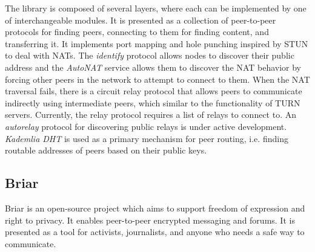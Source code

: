 The library is composed of several layers, where each can be implemented by one of interchangeable modules. It is presented as a collection of peer-to-peer protocols for finding peers, connecting to them for finding content, and transferring it. It implements port mapping and hole punching inspired by STUN to deal with NATs. The \textit{identify} protocol allows nodes to discover their public address and the \textit{AutoNAT} service allows them to discover the NAT behavior by forcing other peers in the network to attempt to connect to them. When the NAT traversal fails, there is a circuit relay protocol that allows peers to communicate indirectly using intermediate peers, which similar to the functionality of TURN servers. Currently, the relay protocol requires a list of relays to connect to. An \textit{autorelay} protocol for discovering public relays is under active development. \textit{Kademlia DHT} is used as a primary mechanism for peer routing, i.e. finding routable addresses of peers based on their public keys.




\subsection{Briar}


Briar \cite{briar_gplay} is an open-source project which aims to support freedom of expression and right to privacy. It enables peer-to-peer encrypted messaging and forums. It is presented as a tool for activists, journalists, and anyone who needs a safe way to communicate.

